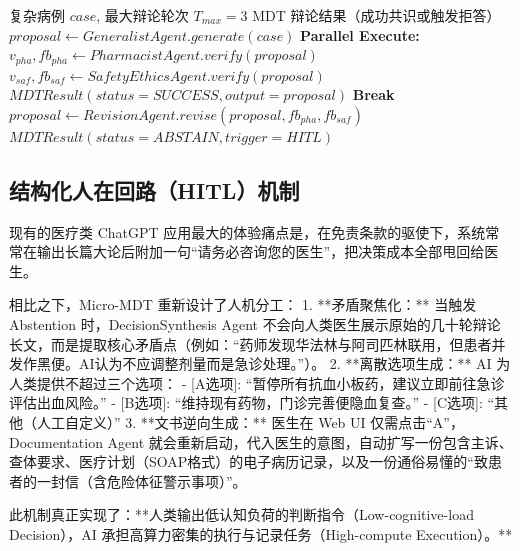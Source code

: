 \documentclass[11pt,a4paper]{ctexart}
\begin{document}
\begin{algorithm}[H]
\caption{多智能体辩论与顺序修正回路 (Multi-Agent Debate Loop)}
\label{alg:debate}
\small
\begin{algorithmic}[1]
\Require 复杂病例 $case$, 最大辩论轮次 $T_{max} = 3$
\Ensure MDT 辩论结果（成功共识或触发拒答）
\State $proposal \leftarrow GeneralistAgent.generate(case)$
    \State \textbf{Parallel Execute:}
    \State \quad $v_{pha}, fb_{pha} \leftarrow PharmacistAgent.verify(proposal)$
    \State \quad $v_{saf}, fb_{saf} \leftarrow SafetyEthicsAgent.verify(proposal)$
        \State \Return $MDTResult(status=SUCCESS, output=proposal)$ 
        \State \textbf{Break} 
    \Else
        \State $proposal \leftarrow RevisionAgent.revise(proposal, fb_{pha}, fb_{saf})$ 
    \EndIf
\EndFor
\State \Return $MDTResult(status=ABSTAIN, trigger=HITL)$ 
\end{algorithmic}
\end{algorithm}

\subsection{结构化人在回路（HITL）机制}

现有的医疗类 ChatGPT 应用最大的体验痛点是，在免责条款的驱使下，系统常常在输出长篇大论后附加一句“请务必咨询您的医生”，把决策成本全部甩回给医生。

相比之下，Micro-MDT 重新设计了人机分工：
1. **矛盾聚焦化：** 当触发 Abstention 时，DecisionSynthesis Agent 不会向人类医生展示原始的几十轮辩论长文，而是提取核心矛盾点（例如：“药师发现华法林与阿司匹林联用，但患者并发作黑便。AI认为不应调整剂量而是急诊处理。”）。
2. **离散选项生成：** AI 为人类提供不超过三个选项：
   - [A选项]: “暂停所有抗血小板药，建议立即前往急诊评估出血风险。”
   - [B选项]: “维持现有药物，门诊完善便隐血复查。”
   - [C选项]: “其他（人工自定义）”
3. **文书逆向生成：** 医生在 Web UI 仅需点击“A”，Documentation Agent 就会重新启动，代入医生的意图，自动扩写一份包含主诉、查体要求、医疗计划（SOAP格式）的电子病历记录，以及一份通俗易懂的“致患者的一封信（含危险体征警示事项）”。

此机制真正实现了：**人类输出低认知负荷的判断指令（Low-cognitive-load Decision），AI 承担高算力密集的执行与记录任务（High-compute Execution）。**
\end{document}
